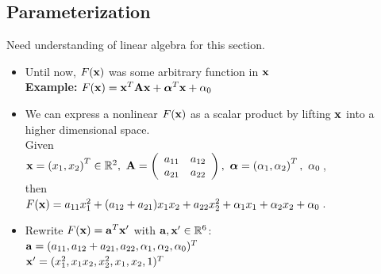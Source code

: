 \subsection{Parameterization}

Need understanding of linear algebra for this section. 

 \begin{itemize}
    \item Until now, $F(\bm{\mathrm{x}})$ was some arbitrary function in $\bm{\mathrm{x}}$ \\[.1cm]
      \textbf{Example:} $ F(\bm{\mathrm{x}}) = \bm{\mathrm{x}}^T \mathbf{A} \bm{\mathrm{x}} + \bm{\mathrm{\alpha}}^T\bm{\mathrm{x}} + \alpha_0 $ \\[.25cm]
    \item We can express a nonlinear $F(\bm{\mathrm{x}})$ as a scalar product by lifting $\bm{\mathrm{x}}$ into a higher dimensional space. \\
      Given \\
     $\bm{\mathrm{x}} = \left(x_1, x_2\right)^T \in \mathbb{R}^2,~ \mathbf{A} = \left( \begin{array}{cc} a_{11} & a_{12} \\ a_{21} & a_{22} \end{array} \right), ~ \bm{\mathrm{\alpha}} = \left(\alpha_1, \alpha_2 \right)^T, ~\alpha_0 $\,, \\
      then \\
      $F(\bm{\mathrm{x}}) = a_{11} x_1^2 + (a_{12} + a_{21}) x_1 x_2 + a_{22} x_2^2 + \alpha_1 x_1 + \alpha_2 x_2 + \alpha_0$\,.\\[.25cm]
    \item Rewrite $F(\bm{\mathrm{x}})=\bm{\mathrm{a}}^T\bm{\mathrm{x}}'$ with $\bm{\mathrm{a}},\bm{\mathrm{x}}' \in \mathbb{R}^6$:
      \\
       $\bm{\mathrm{a}} = (a_{11}, a_{12} + a_{21}, a_{22}, \alpha_1, \alpha_2, \alpha_0)^T$ \\
      $\bm{\mathrm{x}}' = ( x_1^2, x_1 x_2, x_2^2, x_1, x_2, 1)^T$
  \end{itemize}

